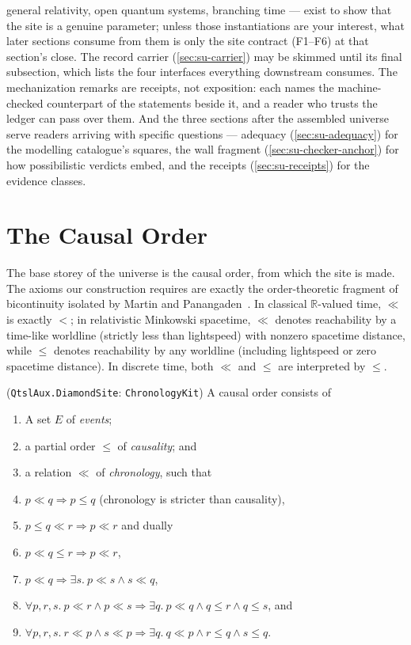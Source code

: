 general relativity, open quantum systems, branching time --- exist to show that
the site is a genuine parameter; unless those instantiations are your interest,
what later sections consume from them is only the site contract (F1--F6) at
that section's close. The record carrier (\autoref{sec:su-carrier}) may be
skimmed until its final subsection, which lists the four interfaces everything
downstream consumes. The mechanization remarks are receipts, not exposition:
each names the machine-checked counterpart of the statements beside it, and a
reader who trusts the ledger can pass over them. And the three sections after
the assembled universe serve readers arriving with specific questions ---
adequacy (\autoref{sec:su-adequacy}) for the modelling catalogue's squares, the
wall fragment (\autoref{sec:su-checker-anchor}) for how possibilistic verdicts
embed, and the receipts (\autoref{sec:su-receipts}) for the evidence classes.


\section{The Causal Order} \label{sec:su-causal-order}

The base storey of the universe is the causal order, from which the site is
made. The axioms our construction requires are exactly the order-theoretic
fragment of bicontinuity isolated by Martin and Panangaden~\cite{martin04}. In
classical $\mathbb{R}$-valued time, $\ll$ is exactly $<$; in relativistic
Minkowski spacetime, $\ll$ denotes reachability by a time-like worldline
(strictly less than lightspeed) with nonzero spacetime distance, while $\le$
denotes reachability by any worldline (including lightspeed or zero spacetime
distance). In discrete time, both $\ll$ and $\le$ are interpreted by $\le$.

\begin{definition}\label{def:su-causal-order}
(\texttt{QtslAux.DiamondSite}: \texttt{ChronologyKit})
A causal order consists of \begin{enumerate}
  \item A set $E$ of \emph{events};
  \item a partial order $\le$ of \emph{causality}; and
  \item a relation $\ll$ of \emph{chronology}, such that
  \item $p \ll q \Rightarrow p \le q$ (chronology is stricter than causality),
  \item $p \le q \ll r \Rightarrow p \ll r$ and dually
  \item $p \ll q \le r \Rightarrow p \ll r$,
  \item $p \ll q \Rightarrow \exists s.\ p \ll s \wedge s \ll q$,
  \item $\forall p,r,s.\ p \ll r \wedge p \ll s \Rightarrow \exists q.\ p \ll q \wedge q \le r \wedge q \le s$, and
  \item $\forall p,r,s.\ r \ll p \wedge s \ll p \Rightarrow \exists q.\ q \ll p \wedge r \le q \wedge s \le q$.
\end{enumerate}
\end{definition}

